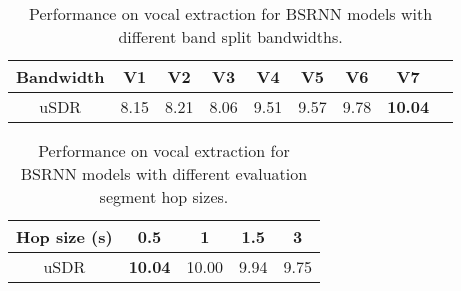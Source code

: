 \begin{table}[!htbp]
    \centering
    \small
    \caption{Performance on vocal extraction for BSRNN models with different band split bandwidths.}
    \begin{tabular}{c|c|c|c|c|c|c|c|c}
    \toprule
        Bandwidth & V1 & V2 & V3 & V4 & V5 & V6 & V7 \\
        \hline
        uSDR & 8.15 & 8.21 & 8.06 & 9.51 & 9.57 & 9.78 & \textbf{10.04} \\
    \bottomrule
    \end{tabular}
    \label{tab:bandwidth}
\end{table}

\begin{table}[!htbp]
    \centering
    \small
    \caption{Performance on vocal extraction for BSRNN models with different evaluation segment hop sizes.}
    \begin{tabular}{c|c|c|c|c}
    \toprule
        Hop size (s) & 0.5 & 1 & 1.5 & 3 \\
        \hline
        uSDR & \textbf{10.04} & 10.00 & 9.94 & 9.75 \\
    \bottomrule
    \end{tabular}
    \label{tab:hop}
\end{table}

